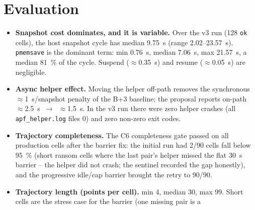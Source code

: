 \documentclass[conference]{IEEEtran}
\begin{document}
\section{Evaluation}
\label{sec:eval}
\begin{itemize}
  \item \textbf{Snapshot cost dominates, and it is variable.} Over the v3 run
        (128 \texttt{ok} cells), the host snapshot cycle has median
        \SI{9.75}{\second} (range \SI{2.02}{}--\SI{23.57}{\second}).
        \texttt{pmemsave} is the dominant term: min \SI{0.76}{\second}, median
        \SI{7.06}{\second}, max \SI{21.57}{\second}, a median \SI{81}{\percent}
        of the cycle. Suspend ($\approx$\SI{0.35}{\second}) and resume
        ($\approx$\SI{0.05}{\second}) are negligible.
  \item \textbf{Async helper effect.} Moving the helper off-path removes the
        synchronous $\approx$\SI{1}{\second}/snapshot penalty of the B+3
        baseline; the proposal reports on-path
        $\approx$\SI{2.5}{\second}~$\rightarrow$~$\approx$\SI{1.5}{\second}.
        In the v3 run there were zero helper crashes (all
        \texttt{apf\_helper.log} files \SI{0}{\byte}) and zero non-zero exit
        codes.
  \item \textbf{Trajectory completeness.} The C6 completeness gate passed on
        all production cells after the barrier fix: the initial run had 2/90
        cells fall below \SI{95}{\percent} (short ransom cells where the last
        pair's helper missed the flat \SI{30}{\second} barrier -- the
        helper did not crash; the sentinel recorded the gap honestly), and the
        progressive idle/cap barrier brought the retry to 90/90.
  \item \textbf{Trajectory length (points per cell).} min 4, median 30, max 99.
        Short cells are the stress case for the barrier (one missing pair is a

\end{itemize}
\end{document}
